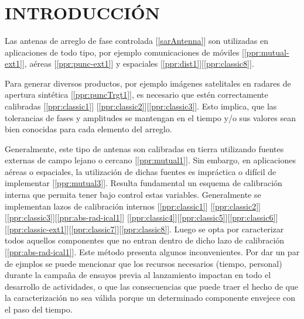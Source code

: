\documentclass[a4paper,10pt]{article}
\title{  }
\begin{document}
	\maketitle %
	
	\tableofcontents %
	\newpage

	\section{INTRODUCCIÓN}
    
Las antenas de arreglo de fase controlada [\ref{sarAntenna}] son utilizadas en 
aplicaciones de todo tipo, por ejemplo comunicaciones de móviles 
[\ref{ppr:mutual-ext1}], aéreas [\ref{ppr:punc-ext1}] y espaciales 
[\ref{ppr:dist1}][\ref{ppr:classic8}]. 

Para generar diversos productos, por ejemplo imágenes satelitales en radares de
apertura sintética [\ref{ppr:puncTrgt1}], 
es necesario que estén correctamente calibradas [\ref{ppr:classic1}] 
[\ref{ppr:classic2}][\ref{ppr:classic3}]. Esto implica, que las tolerancias de
fases y amplitudes se mantengan en el tiempo y/o sus valores sean bien conocidas
para cada elemento del arreglo.

Generalmente, este tipo de antenas son calibradas en tierra utilizando fuentes 
externas de campo lejano o cercano [\ref{ppr:mutual1}]. Sin embargo, en 
aplicaciones aéreas o espaciales, la utilización de dichas fuentes es impráctica
o difícil de implementar [\ref{ppr:mutual3}]. Resulta fundamental un esquema de
calibración interna que permita tener bajo control estas variables. Generalmente
se implementan lazos de calibración internos [\ref{ppr:classic1}]
[\ref{ppr:classic2}][\ref{ppr:classic3}][\ref{ppr:abs-rad-ical1}]
[\ref{ppr:classic4}][\ref{ppr:classic5}][\ref{ppr:classic6}]
[\ref{ppr:classic-ext1}][\ref{ppr:classic7}][\ref{ppr:classic8}]. 
Luego se opta por caracterizar todos aquellos componentes que no entran dentro 
de dicho lazo de calibración [\ref{ppr:abs-rad-ical1}].
Este método presenta algunos inconvenientes. Por dar un par de ejmplos se puede
mencionar que los recursos necesarios (tiempo, personal) durante la campaña de 
ensayos previa al lanzamiento impactan en todo el desarrollo de actividades, o
que las consecuencias que puede traer el hecho de que la caracterización no sea
válida porque un determinado componente envejece con el paso del tiempo.
\end{document}
